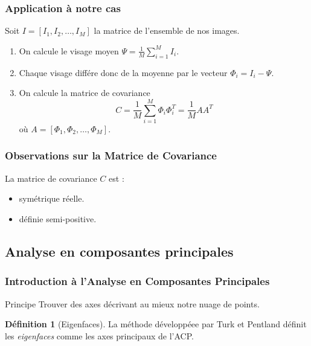 \documentclass{beamer}
\theoremstyle{plain}
\theoremstyle{definition}
\newtheorem{defi}{Définition}
\begin{document}
\begin{frame}
  \frametitle{Application à notre cas}
  Soit $I = [I_1,I_2,\dotsc,I_M]$ la matrice de l'ensemble de nos images.
  \begin{enumerate}
  \item<2-> On calcule le visage moyen $\Psi = \frac{1}{M}\displaystyle\sum_{i=1}^{M} I_i$.
  \item<3-> Chaque visage différe donc de la moyenne par le vecteur $\Phi_i = I_i - \Psi$.
  \item<4-> On calcule la matrice de covariance
    \[
      C = \frac{1}{M} \displaystyle\sum_{i=1}^{M} \Phi_i \Phi_i^T = \frac{1}{M} AA^T 
    \]
    où $A = [\Phi_1,\Phi_2,\dotsc,\Phi_M]$.    
  \end{enumerate}
\end{frame}



\begin{frame}
  \frametitle{Observations sur la Matrice de Covariance}
  La matrice de covariance $C$ est :
  \begin{itemize}
  \item<2-> symétrique réelle.
  \item<3-> définie semi-positive.
  \end{itemize}
\end{frame}



\subsection{Analyse en composantes principales}



\begin{frame}
  \frametitle{Introduction à l'Analyse en Composantes Principales}
  \begin{block}{Principe}
    Trouver des axes décrivant au mieux notre nuage de points.
  \end{block}
  \pause
  \begin{defi}[Eigenfaces]
    La méthode développéee par Turk et Pentland définit les \emph{eigenfaces} comme les axes principaux de l'ACP.
  \end{defi}
\end{frame}




\end{document}
